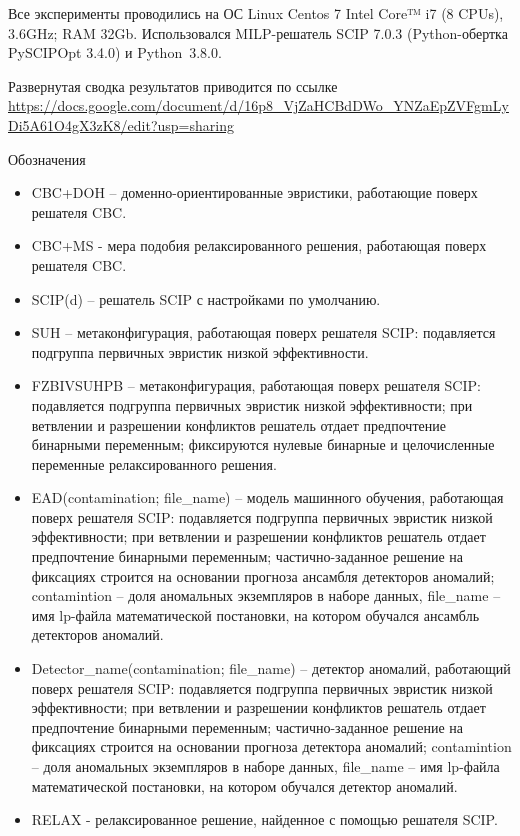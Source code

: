 \documentclass[%
	11pt,
	a4paper,
	utf8,
		]{article}
\begin{document}
{
Все эксперименты проводились на ОС Linux Centos 7 Intel Core™ i7 (8 CPUs), 3.6GHz; RAM 32Gb. Использовался MILP-решатель SCIP 7.0.3 (Python-обертка PySCIPOpt 3.4.0) и Python~3.8.0.
}

Развернутая сводка результатов приводится по ссылке \url{https://docs.google.com/document/d/16p8_VjZaHCBdDWo_YNZaEpZVFgmLyDi5A61O4gX3zK8/edit?usp=sharing}

{Обозначения}
\begin{itemize}
	\item CBC+DOH – доменно-ориентированные эвристики, работающие поверх решателя CBC.
	
    \item CBC+MS - мера подобия релаксированного решения, работающая поверх решателя CBC.
    
    \item SCIP(d) – решатель SCIP с настройками по умолчанию.
    
    \item SUH – метаконфигурация, работающая поверх решателя SCIP: подавляется подгруппа первичных эвристик низкой эффективности.
    
    \item FZBIVSUHPB – метаконфигурация, работающая поверх решателя SCIP: подавляется подгруппа первичных эвристик низкой эффективности; при ветвлении и разрешении конфликтов решатель отдает предпочтение бинарными переменным; фиксируются нулевые бинарные и целочисленные переменные релаксированного решения.
    
    \item {EAD(contamination; file\_name)} – модель машинного обучения, работающая поверх решателя SCIP: подавляется подгруппа первичных эвристик низкой эффективности; при ветвлении и разрешении конфликтов решатель отдает предпочтение бинарными переменным; частично-заданное решение на фиксациях строится на основании прогноза ансамбля детекторов аномалий; {contamintion} – доля аномальных экземпляров в наборе данных, {file\_name} – имя lp-файла математической постановки, на котором обучался ансамбль детекторов аномалий.
    
    \item Detector\_name(contamination; file\_name) – детектор аномалий, работающий поверх решателя SCIP: подавляется подгруппа первичных эвристик низкой эффективности; при ветвлении и разрешении конфликтов решатель отдает предпочтение бинарными переменным; частично-заданное решение на фиксациях строится на основании прогноза детектора аномалий; contamintion – доля аномальных экземпляров в наборе данных, file\_name – имя lp-файла математической постановки, на котором обучался детектор аномалий.
    
    \item RELAX - релаксированное решение, найденное с помощью решателя SCIP.
\end{itemize}
\end{document}
